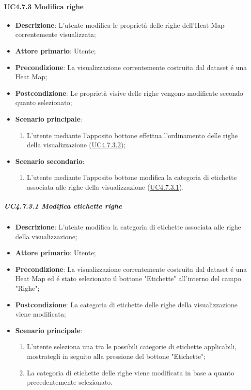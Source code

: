 \paragraph{UC4.7.3 Modifica righe}
\label{par:uc4.7.3}
\begin{itemize}
    \item \textbf{Descrizione}:     L'utente modifica le proprietà delle righe dell'Heat Map correntemente visualizzata;
    \item \textbf{Attore primario}: Utente;
    \item \textbf{Precondizione}:   La visualizzazione correntemente costruita dal dataset é una Heat Map;
    \item \textbf{Postcondizione}:  Le proprietà visive delle righe vengono modificate secondo quanto selezionato;
    
    \item \textbf{Scenario principale}:
    \begin{enumerate}
        \item L'utente mediante l'apposito bottone effettua l'ordinamento delle righe della visualizzazione (\hyperref[spar:uc4.7.3.2]{UC4.7.3.2});
    \end{enumerate}
    \item \textbf{Scenario secondario}:
    \begin{enumerate}
        \item L'utente mediante l'apposito bottone modifica la categoria di etichette associata alle righe della visualizzazione (\hyperref[spar:uc4.7.3.1]{UC4.7.3.1}).
    \end{enumerate}
\end{itemize}
    
\subparagraph{UC4.7.3.1 Modifica etichette righe}
\label{spar:uc4.7.3.1}
\begin{itemize}
    \item \textbf{Descrizione}:     L'utente modifica la categoria di etichette associata alle righe della visualizzazione;
    \item \textbf{Attore primario}: Utente;
    \item \textbf{Precondizione}:   La visualizzazione correntemente costruita dal dataset é una Heat Map ed é stato selezionato il bottone "Etichette" all'interno del campo "Righe";
    \item \textbf{Postcondizione}:  La categoria di etichette delle righe della visualizzazione viene modificata;
    \item \textbf{Scenario principale}:
    \begin{enumerate}
        \item L'utente seleziona una tra le possibili categorie di etichette applicabili, mostrategli in seguito alla pressione del bottone "Etichette";
        \item La categoria di etichette delle righe viene modificata in base a quanto precedentemente selezionato.
    \end{enumerate}
\end{itemize}

